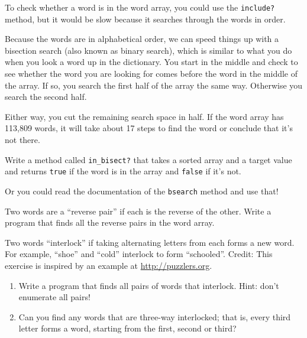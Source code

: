 \documentclass[10pt]{book}
\begin{document}
\begin{exercise}
\label{wordarray1}
\label{bisection}

To check whether a word is in the word array, you could use
the {\tt include?} method, but it would be slow because it searches
through the words in order.

Because the words are in alphabetical order, we can speed things up
with a bisection search (also known as binary search), which is
similar to what you do when you look a word up in the dictionary.  You
start in the middle and check to see whether the word you are looking
for comes before the word in the middle of the array.  If so, you
search the first half of the array the same way.  Otherwise you search
the second half.

Either way, you cut the remaining search space in half.  If the
word array has 113,809 words, it will take about 17 steps to
find the word or conclude that it's not there.

Write a method called \verb"in_bisect?" that takes a sorted array
and a target value and returns {\tt true} if the word is
in the array and {\tt false} if it's not.

Or you could read the documentation of the {\tt bsearch} method
and use that!


\end{exercise}

\begin{exercise}

Two words are a ``reverse pair'' if each is the reverse of the
other.  Write a program that finds all the reverse pairs in the
word array.
    

\end{exercise}

\begin{exercise}

Two words ``interlock'' if taking alternating letters from each forms
a new word.  For example, ``shoe'' and ``cold''
interlock to form ``schooled''.
Credit: This exercise is inspired by an example at \url{http://puzzlers.org}.

\begin{enumerate}

\item Write a program that finds all pairs of words that interlock.
  Hint: don't enumerate all pairs!

\item Can you find any words that are three-way interlocked; that is,
  every third letter forms a word, starting from the first, second or
  third?

\end{enumerate}
\end{exercise}
\end{document}
